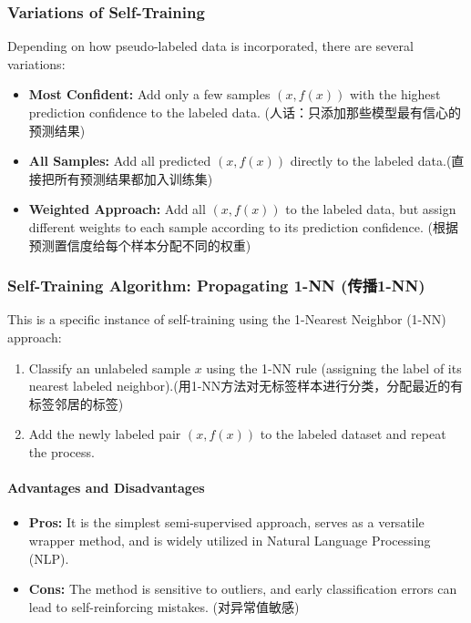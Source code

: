 \documentclass[UTF8]{ctexart}
\begin{document}
\subsubsection{Variations of Self-Training}
Depending on how pseudo-labeled data is incorporated, there are several variations:
\begin{itemize}
    \item \textbf{Most Confident:} Add only a few samples $(x, f(x))$ with the highest prediction confidence to the labeled data. (人话：只添加那些模型最有信心的预测结果)
    \item \textbf{All Samples:} Add all predicted $(x, f(x))$ directly to the labeled data.(直接把所有预测结果都加入训练集)
    \item \textbf{Weighted Approach:} Add all $(x, f(x))$ to the labeled data, but assign different weights to each sample according to its prediction confidence.
    (根据预测置信度给每个样本分配不同的权重)
\end{itemize}

\subsubsection{Self-Training Algorithm: Propagating 1-NN (传播1-NN)}
This is a specific instance of self-training using the 1-Nearest Neighbor (1-NN) approach:
\begin{enumerate}
    \item Classify an unlabeled sample $x$ using the 1-NN rule (assigning the label of its nearest labeled neighbor).(用1-NN方法对无标签样本进行分类，分配最近的有标签邻居的标签)
    \item Add the newly labeled pair $(x, f(x))$ to the labeled dataset and repeat the process.
\end{enumerate}

\paragraph{Advantages and Disadvantages} 
\begin{itemize}
    \item \textbf{Pros:} It is the simplest semi-supervised approach, serves as a versatile wrapper method, and is widely utilized in Natural Language Processing (NLP).
    \item \textbf{Cons:} The method is sensitive to outliers, and early classification errors can lead to self-reinforcing mistakes.
    (对异常值敏感)
\end{itemize}
\end{document}
